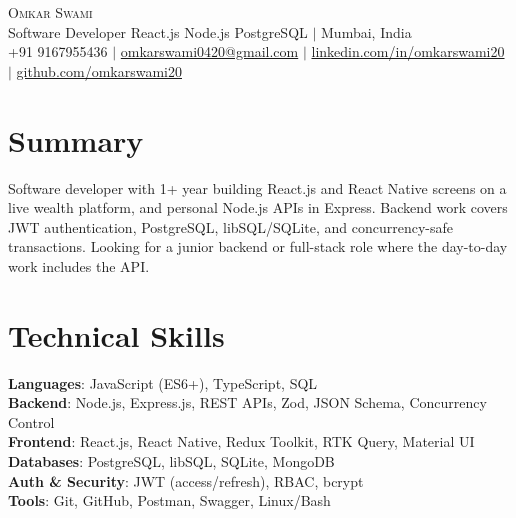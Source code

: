 \documentclass[a4paper,11pt]{article}
\begin{document}
\begin{center}
  {\Huge \scshape Omkar Swami} \\ \vspace{2pt}
  \small Software Developer \textbar{} React.js \textbar{} Node.js \textbar{} PostgreSQL \quad $|$ \quad Mumbai, India \\ \vspace{3pt}
  \small +91 9167955436 $|$
  \href{mailto:omkarswami0420@gmail.com}{omkarswami0420@gmail.com} $|$
  \href{https://linkedin.com/in/omkarswami20}{linkedin.com/in/omkarswami20} $|$
  \href{https://github.com/omkarswami20}{github.com/omkarswami20}
\end{center}
\vspace{-4pt}

\section{Summary}
\small{Software developer with 1+ year building React.js and React Native screens on a live wealth platform, and personal Node.js APIs in Express. Backend work covers JWT authentication, PostgreSQL, libSQL/SQLite, and concurrency-safe transactions. Looking for a junior backend or full-stack role where the day-to-day work includes the API.}

\section{Technical Skills}
\begin{itemize}[leftmargin=0in, label={}]
\small{\item{
  \textbf{Languages}{: JavaScript (ES6+), TypeScript, SQL} \\
  \textbf{Backend}{: Node.js, Express.js, REST APIs, Zod, JSON Schema, Concurrency Control} \\
  \textbf{Frontend}{: React.js, React Native, Redux Toolkit, RTK Query, Material UI} \\
  \textbf{Databases}{: PostgreSQL, libSQL, SQLite, MongoDB} \\
  \textbf{Auth \& Security}{: JWT (access/refresh), RBAC, bcrypt} \\
  \textbf{Tools}{: Git, GitHub, Postman, Swagger, Linux/Bash}
}}
\end{itemize}
\vspace{-4pt}

\end{document}
